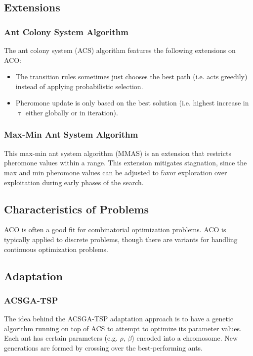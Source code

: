 \documentclass[12pt,titlepage]{article}
\begin{document}
    \subsection{Extensions}

      \subsubsection{Ant Colony System Algorithm}
        The ant colony system (ACS) algorithm features the following extensions on ACO:
        \begin{itemize}
          \item The transition rules sometimes just chooses the best path (i.e. acts greedily) instead of applying probabilistic selection.
          \item Pheromone update is only based on the best solution (i.e. highest increase in $\uptau$ either globally or in iteration).
        \end{itemize}

      \subsubsection{Max-Min Ant System Algorithm}
        This max-min ant system algorithm (MMAS) is an extension that restricts pheromone values within a range. This extension
        mitigates stagnation, since the max and min pheromone values can be adjusted to favor exploration over exploitation during early
        phases of the search.

    \subsection{Characteristics of Problems}
      ACO is often a good fit for combinatorial optimization problems. ACO is typically applied to discrete problems, though there are variants
      for handling continuous optimization problems.

    \subsection{Adaptation}

      \subsubsection{ACSGA-TSP}
        The idea behind the ACSGA-TSP adaptation approach is to have a genetic algorithm running on top of ACS to attempt to optimize its parameter values.
        Each ant has certain parameters (e.g. $\rho$, $\beta$) encoded into a chromosome. New generations are formed by crossing over the best-performing
        ants.
\end{document}
